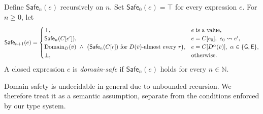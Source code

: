 \begin{definition}
Define $\mathsf{Safe}_n(e)$ recursively on $n$.
Set $\mathsf{Safe}_0(e)=\top$ for every expression $e$.
For $n\geq 0$, let
\[
\mathsf{Safe}_{n+1}(e)=
\begin{cases}
  \top,
    & e \text{ is a value},\\
  \mathsf{Safe}_n(C[e']),
    & e=C[e_0],\ e_0\rightsquigarrow e',\\
  \operatorname{Domain}_D(\bar v)
  \ \land\
  \bigl(\mathsf{Safe}_n(C[r])
    \text{ for }D(\bar v)\text{-almost every }r\bigr),
    & e=C[D^\alpha(\bar v)],\
      \alpha\in\{\mathsf{G},\mathsf{E}\},\\
  \bot,
    & \text{otherwise}.
\end{cases}
\]
A closed expression $e$ is \emph{domain-safe} if
$\mathsf{Safe}_n(e)$ holds for every $n\in\mathbb N$.
\end{definition}

Domain safety is undecidable in general due to unbounded recursion. We therefore treat it as a semantic assumption, separate from the conditions enforced by our type system.
